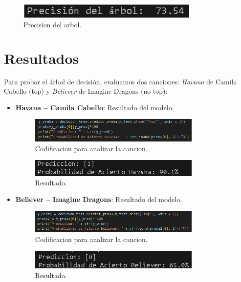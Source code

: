 \documentclass[a4paper,12pt]{article}
\begin{document}
\begin{figure}[H]
    \centering
    \includegraphics[width=0.8\textwidth]{30.png}
    \caption{Precision del arbol.}
    \label{fig:decision_tree}
\end{figure}

\section{Resultados}
Para probar el árbol de decisión, evaluamos dos canciones: \textit{Havana} de Camila Cabello (top) y \textit{Believer} de Imagine Dragons (no top):

\begin{itemize}
    \item \textbf{Havana – Camila Cabello}: Resultado del modelo.
    \begin{figure}[H]
        \centering
        \includegraphics[width=0.8\textwidth]{31.png}
        \caption{Codificacion para analizar la cancion.}
        \label{fig:decision_tree}
    \end{figure}

    \begin{figure}[H]
        \centering
        \includegraphics[width=0.8\textwidth]{32.png}
        \caption{Resultado.}
        \label{fig:decision_tree}
    \end{figure}

    \item \textbf{Believer – Imagine Dragons}: Resultado del modelo.
    \begin{figure}[H]
        \centering
        \includegraphics[width=0.8\textwidth]{33.png}
        \caption{Codificacion para analizar la cancion.}
        \label{fig:decision_tree}
    \end{figure}

    \begin{figure}[H]
        \centering
        \includegraphics[width=0.8\textwidth]{34.png}
        \caption{Resultado.}
        \label{fig:decision_tree}
    \end{figure}
\end{itemize}
\end{document}
